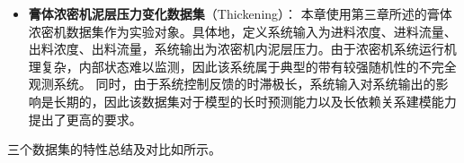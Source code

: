 \begin{itemize}
    \item \textbf{膏体浓密机泥层压力变化数据集}（Thickening）：
    本章使用第三章所述的膏体浓密机数据集作为实验对象。具体地，定义系统输入为进料浓度、进料流量、出料浓度、出料流量，系统输出为浓密机内泥层压力。由于浓密机系统运行机理复杂，内部状态难以监测，因此该系统属于典型的带有较强随机性的不完全观测系统。
    同时，由于系统控制反馈的时滞极长，系统输入对系统输出的影响是长期的，因此该数据集对于模型的长时预测能力以及长依赖关系建模能力提出了更高的要求。
    
\end{itemize}
三个数据集的特性总结及对比如所示。
\begin{table}
\centering
\caption{数据集特性}
\label{tab:5_dataset}
\end{table}
